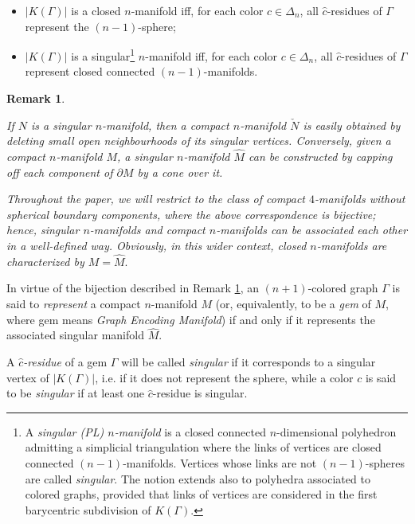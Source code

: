 \documentclass[12pt,a4paper]{article}
\newtheorem{remark}{Remark}
\newcommand{\G}{\Gamma}
\begin{document}
\begin{itemize}
    \item $\vert K(\G)\vert$ is a closed $n$-manifold iff, for each color $c\in\Delta_n$, all $\hat c$-residues of $\G$ represent the $(n-1)$-sphere; 
    \item  $\vert K(\G)\vert$ is a singular\footnote{A {\it singular (PL) $n$-manifold} is a closed connected $n$-dimensional polyhedron admitting a simplicial triangulation where the links of vertices are closed connected $(n-1)$-manifolds. Vertices whose links are not %
    $(n-1)$-spheres are called {\it singular}.
The notion extends also to polyhedra associated to colored graphs, provided that links of vertices are  considered in the first barycentric subdivision of $K(\Gamma)$.}  $n$-manifold iff, for each color $c\in\Delta_n$, all $\hat c$-residues of $\G$ represent closed connected $(n-1)$-manifolds.
\end{itemize}


\begin{remark} \label{correspondence-sing-boundary}  {\em If $N$ is a singular $n$-manifold, then a compact $n$-manifold $\check N$ is easily obtained by deleting small open neighbourhoods of its singular vertices.
Conversely, given a compact $n$-manifold $M$, a singular $n$-manifold $\widehat M$ can be constructed by capping off each component of $\partial M$ by a cone over it.

Throughout the paper, we will restrict to the class of compact $4$-manifolds without spherical boundary components, where the above correspondence is bijective; hence, singular $n$-manifolds and compact $n$-manifolds can be associated each other in a well-defined way. 
Obviously, in this wider context, closed $n$-manifolds are characterized by $M= \widehat M.$  }
\end{remark}

In virtue of the bijection described in Remark \ref{correspondence-sing-boundary}, an $(n+1)$-colored graph $\G$ is said to {\it represent}
a compact $n$-manifold $M$ 
(or, equivalently, to be a {\it gem} of $M$, where gem means {\it Graph Encoding Manifold})  if and only if  it represents the associated singular manifold $\widehat M$.  

A {\it $\hat c$-residue} of a gem $\G$ will be called {\it singular} if it corresponds to a singular vertex of $\vert K(\G) \vert$, i.e. if it does not represent the sphere, while a color $c$ is said to be {\it singular} if at least one $\hat c$-residue is singular.  
\end{document}
